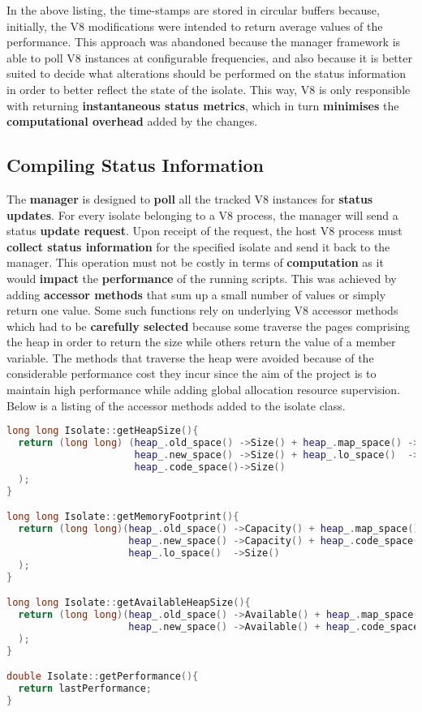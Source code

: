 \documentclass{l4proj}
\begin{document}
\hspace*{1em} In the above listing, the time-stamps are stored in circular buffers because, initially, the V8 modifications were intended to return average values of the performance. This approach was abandoned because the manager framework is able to poll V8 instances at configurable frequencies, and also because it is better suited to decide what alterations should be performed on the status information in order to better reflect the state of the isolate. This way, V8 is only responsible with returning \textbf{instantaneous status metrics}, which in turn \textbf{minimises} the \textbf{computational overhead} added by the changes. 
\subsection{Compiling Status Information}
\hspace*{1em} The \textbf{manager} is designed to \textbf{poll} all the tracked V8 instances for \textbf{status updates}. For every isolate belonging to a V8 process, the manager will send a status \textbf{update request}. Upon receipt of the request, the host V8 process must \textbf{collect status information} for the specified isolate and send it back to the manager. This operation must not be costly in terms of \textbf{computation} as it would \textbf{impact} the \textbf{performance} of the running scripts. This was achieved by adding \textbf{accessor methods} that sum up a small number of values or simply return one value. Some such functions rely on underlying V8 accessor methods which had to be \textbf{carefully selected} because some traverse the pages comprising the heap in order to return the size while others return the value of a member variable. The methods that traverse the heap were avoided because of the considerable performance cost they incur since the aim of the project is to maintain high performance while adding global allocation resource supervision. Below is a listing of the accessor methods added to the isolate class.
\begin{lstlisting}[language=cpp]
long long Isolate::getHeapSize(){
  return (long long) (heap_.old_space() ->Size() + heap_.map_space() ->Size() +
                      heap_.new_space() ->Size() + heap_.lo_space()  ->Size() +
                      heap_.code_space()->Size()
  );
}

long long Isolate::getMemoryFootprint(){
  return (long long)(heap_.old_space() ->Capacity() + heap_.map_space() ->Capacity() +
                     heap_.new_space() ->Capacity() + heap_.code_space()->Capacity() +
                     heap_.lo_space()  ->Size()
  );
}

long long Isolate::getAvailableHeapSize(){
  return (long long)(heap_.old_space() ->Available() + heap_.map_space() ->Available() +
                     heap_.new_space() ->Available() + heap_.code_space()->Available()
  );
}

double Isolate::getPerformance(){
  return lastPerformance;
}
\end{lstlisting}
\end{document}
